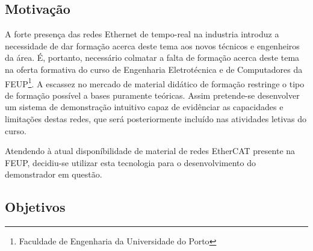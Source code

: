 % 

\subsection{Motivação}\label{sec:motivacao}

A forte presença das redes Ethernet de tempo-real na industria introduz a necessidade de dar formação acerca deste tema aos novos técnicos e engenheiros da área.
É, portanto, necessário colmatar a falta de formação acerca deste tema na oferta formativa do curso de Engenharia Eletrotécnica e de Computadores da FEUP\footnote{Faculdade de Engenharia da Universidade do Porto}.
A escassez no mercado de material didático de formação restringe o tipo de formação possível a bases puramente teóricas.
Assim pretende-se desenvolver um sistema de demonstração intuitivo capaz de evidênciar as capacidades e limitações destas redes, que será posteriormente incluído nas atividades letivas do curso.

Atendendo à atual disponíbilidade de material de redes EtherCAT presente na FEUP, decidiu-se utilizar esta tecnologia para o desenvolvimento do demonstrador em questão. 

% 
% 


\subsection{Objetivos}\label{sec:objetivos}

